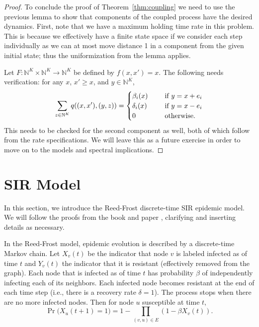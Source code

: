 \documentclass[11pt]{article}
\begin{document}
\begin{proof}
To conclude the proof of Theorem~\ref{thm:coupling} we need to use the previous lemma to show that components of the coupled process have the desired dynamics. First, note that we have a maximum holding time rate in this problem. This is because we effectively have a finite state space if we consider each step individually as we can at most move distance 1 in a component from the given initial state; thus the uniformization from the lemma applies.

Let $F:\mathbb{N}^K \times \mathbb{N}^K \rightarrow \mathbb{N}^K$ be defined by $f(x,x')=x$. The following needs verification: for any $x$, $x' \geq x$, and $y\in \mathbb{N}^K$,
$$\sum_{z\in \mathbb{N}^K} q((x,x'),(y,z)) =
\begin{cases}
\beta_i(x) \hspace{0.5cm} & \text{if } y = x+e_i \\
\delta_i(x) \hspace{0.5cm} & \text{if } y=x-e_i \\
0 \hspace{0.5cm} & \text{otherwise.}
\end{cases}$$
This needs to be checked for the second component as well, both of which follow from the rate specifications. We will leave this as a future exercise in order to move on to the models and spectral implications.
\end{proof}


\section{SIR Model} \label{sec:SIR}

In this section, we introduce the Reed-Frost discrete-time SIR epidemic model. We will follow the proofs from the book \cite{draief:epidemics} and paper \cite{draief:SIR_paper}, clarifying and inserting details as necessary.

In the Reed-Frost model, epidemic evolution is described by a discrete-time Markov chain. Let $X_v(t)$ be the indicator that node $v$ is labeled infected as of time $t$ and $Y_v(t)$ the indicator that it is resistant (effectively removed from the graph). Each node that is infected as of time $t$ has probability $\beta$ of independently infecting each of its neighbors. Each infected node becomes resistant at the end of each time step (i.e., there is a recovery rate $\delta=1$). The process stops when there are no more infected nodes. Then for node $u$ susceptible at time $t$,
$$\Pr\Big( X_u(t+1) = 1\Big) = 1-\prod_{(v,u)\in E} (1-\beta X_v(t)).$$
\end{document}
